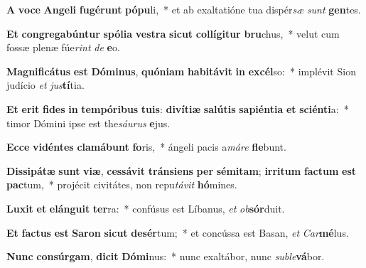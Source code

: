\item \textbf{A} \textbf{vo}\textbf{ce} \textbf{An}\textbf{ge}\textbf{li} \textbf{fu}\textbf{gé}\textbf{runt} \textbf{pó}\textbf{pu}li,~* et ab exaltatióne tua dispér\textit{sæ} \textit{sunt} \textbf{gen}tes.
\item \textbf{Et} \textbf{con}\textbf{gre}\textbf{ga}\textbf{bún}\textbf{tur} \textbf{spó}\textbf{li}\textbf{a} \textbf{ves}\textbf{tra} \textbf{sic}\textbf{ut} \textbf{col}\textbf{lí}\textbf{gi}\textbf{tur} \textbf{bru}chus,~* velut cum fossæ plenæ fúe\textit{rint} \textit{de} \textbf{e}o.
\item \textbf{Ma}\textbf{gni}\textbf{fi}\textbf{cá}\textbf{tus} \textbf{est} \textbf{Dó}\textbf{mi}\textbf{nus}, \textbf{quón}\textbf{i}\textbf{am} \textbf{ha}\textbf{bi}\textbf{tá}\textbf{vit} \textbf{in} \textbf{ex}\textbf{cél}so:~* implévit Sion judício \textit{et} \textit{jus}\textbf{tí}tia.
\item \textbf{Et} \textbf{e}\textbf{rit} \textbf{fi}\textbf{des} \textbf{in} \textbf{tem}\textbf{pó}\textbf{ri}\textbf{bus} \textbf{tu}\textbf{is}: \textbf{di}\textbf{ví}\textbf{ti}\textbf{æ} \textbf{sa}\textbf{lú}\textbf{tis} \textbf{sa}\textbf{pi}\textbf{én}\textbf{ti}\textbf{a} \textbf{et} \textbf{sci}\textbf{én}\textbf{ti}a:~* timor Dómini ipse est the\textit{sáu}\textit{rus} \textbf{e}jus.
\item \textbf{Ec}\textbf{ce} \textbf{vi}\textbf{dén}\textbf{tes} \textbf{cla}\textbf{má}\textbf{bunt} \textbf{fo}ris,~* ángeli pacis a\textit{má}\textit{re} \textbf{fle}bunt.
\item \textbf{Dis}\textbf{si}\textbf{pá}\textbf{tæ} \textbf{sunt} \textbf{vi}\textbf{æ}, \textbf{ces}\textbf{sá}\textbf{vit} \textbf{tráns}\textbf{i}\textbf{ens} \textbf{per} \textbf{sé}\textbf{mi}\textbf{tam}; \textbf{ir}\textbf{ri}\textbf{tum} \textbf{fac}\textbf{tum} \textbf{est} \textbf{pac}tum,~* projécit civitátes, non repu\textit{tá}\textit{vit} \textbf{hó}mines.
\item \textbf{Lu}\textbf{xit} \textbf{et} \textbf{e}\textbf{lán}\textbf{gu}\textbf{it} \textbf{ter}ra:~* confúsus est Líbanus, \textit{et} \textit{ob}\textbf{sór}duit.
\item \textbf{Et} \textbf{fac}\textbf{tus} \textbf{est} \textbf{Sa}\textbf{ron} \textbf{sic}\textbf{ut} \textbf{de}\textbf{sér}tum;~* et concússa est Basan, \textit{et} \textit{Car}\textbf{mé}lus.
\item \textbf{Nunc} \textbf{con}\textbf{súr}\textbf{gam}, \textbf{di}\textbf{cit} \textbf{Dó}\textbf{mi}nus:~* nunc exaltábor, nunc \textit{sub}\textit{le}\textbf{vá}bor.
